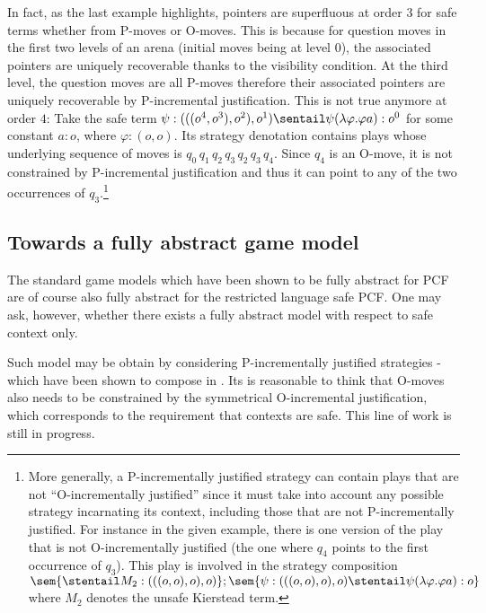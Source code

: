 
In fact, as the last example highlights, pointers are superfluous at
order $3$ for safe terms whether from P-moves or O-moves. This is
because for question moves in the first two levels of an arena
(initial moves being at level $0$), the associated pointers are
uniquely recoverable thanks to the visibility condition. At the
third level, the question moves are all P-moves therefore their
associated pointers are uniquely recoverable by P-incremental
justification. This is not true anymore at order $4$: Take the safe
term $\psi:(((o^4,o^3),o^2),o^1) \sentail \psi (\lambda \varphi .
\varphi a) : o^0$ for some constant $a:o$, where $\varphi:(o,o)$.
Its strategy denotation contains plays whose underlying sequence of
moves is $q_0 \, q_1 \, q_2 \, q_3 \, q_2 \, q_3 \, q_4$. Since
$q_4$ is an O-move, it is not constrained by P-incremental
justification and thus it can point to any of the two occurrences of
$q_3$.\footnote{More generally, a P-incrementally justified strategy
can contain plays that are not ``O-incrementally justified'' since
it must take into account any possible strategy incarnating its
context, including those that are not P-incrementally justified. For
instance in the given example, there is one version of the play that
is not O-incrementally justified (the one where $q_4$ points to the
first occurrence of $q_3$). This play is involved in the strategy
composition $\sem{ \stentail M_2 : (((o,o),o),o)} ; \sem{
\psi:(((o,o),o),o) \stentail \psi (\lambda \varphi . \varphi a):o}$
where $M_2$ denotes the unsafe Kierstead term.}


\subsection*{Towards a fully abstract game model}\hfill

The standard game models which have been shown to be fully abstract
for PCF \cite{abramsky94full,hylandong_pcf} are of course also fully
abstract for the restricted language safe PCF. One may ask, however,
whether there exists a fully abstract model with respect to safe
context only.

Such model may be obtain by considering P-incrementally justified strategies
- which have been shown to compose in \cite{Blumphd}. Its is reasonable to think that
 O-moves also needs to be constrained by the symmetrical O-incremental justification, which corresponds to the requirement that contexts are safe. This line of work is still in progress.


